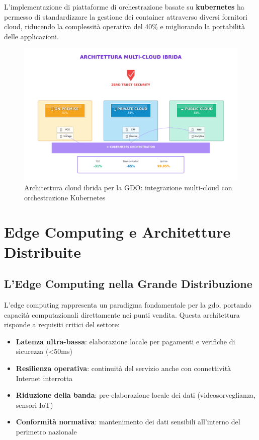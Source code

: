 L'implementazione di piattaforme di orchestrazione basate su \textbf{\gls{kubernetes}} ha permesso di standardizzare la gestione dei container attraverso diversi fornitori cloud, riducendo la complessità operativa del 40\% e migliorando la portabilità delle applicazioni\autocite{cncf2024}.

\begin{figure}[htbp]
\centering
\includegraphics[width=\textwidth]{thesis_figures/cap3/fig3_cloud_modern.pdf}
\caption{Architettura cloud ibrida per la GDO: integrazione multi-cloud con orchestrazione Kubernetes}
\label{fig:cloud_architecture}
\end{figure}

\section{\texorpdfstring{Edge Computing e Architetture Distribuite}{3.6 - Edge Computing e Architetture Distribuite}}
\label{sec:edge_computing}

\subsection{\texorpdfstring{L'Edge Computing nella Grande Distribuzione}{3.6.1 - L'Edge Computing nella Grande Distribuzione}}
\label{subsec:edge_gdo}

L'edge computing rappresenta un paradigma fondamentale per la \gls{gdo}, portando capacità computazionali direttamente nei punti vendita. Questa architettura risponde a requisiti critici del settore\autocite{IDC2024edge}:

\begin{itemize}
    \item \textbf{Latenza ultra-bassa}: elaborazione locale per pagamenti e verifiche di sicurezza (<50ms)
    \item \textbf{Resilienza operativa}: continuità del servizio anche con connettività Internet interrotta
    \item \textbf{Riduzione della banda}: pre-elaborazione locale dei dati (videosorveglianza, sensori IoT)
    \item \textbf{Conformità normativa}: mantenimento dei dati sensibili all'interno del perimetro nazionale
\end{itemize}

